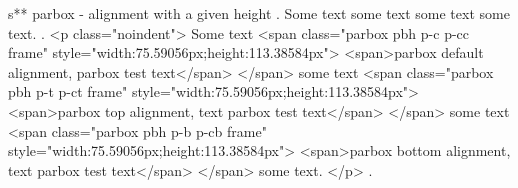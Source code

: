 s** parbox - alignment with a given height
.
\noindent
Some text
some text
some text
some text.
.
<p class="noindent">
Some text <span class="parbox pbh p-c p-cc frame" style="width:75.59056px;height:113.38584px">
<span>parbox default alignment, parbox test text</span>
</span> some text <span class="parbox pbh p-t p-ct frame" style="width:75.59056px;height:113.38584px">
<span>parbox top alignment, text parbox test text</span>
</span> some text <span class="parbox pbh p-b p-cb frame" style="width:75.59056px;height:113.38584px">
<span>parbox bottom alignment, text parbox test text</span>
</span> some text.
</p>
.

